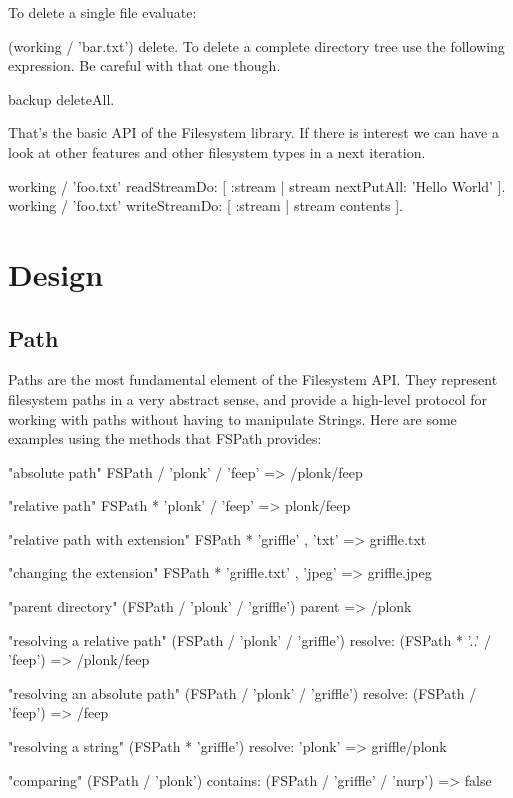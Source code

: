 \documentclass[a4paper,10pt,twoside]{book}
\begin{document}
To delete a single file evaluate:

 (working / 'bar.txt') delete.
To delete a complete directory tree use the following expression. Be careful with that one though.

 backup deleteAll.
 
That's the basic API of the Filesystem library. If there is interest we can have a look at other features and other filesystem types in a next iteration.



 working / 'foo.txt' readStreamDo: [ :stream | stream nextPutAll: 'Hello World' ].
 working / 'foo.txt' writeStreamDo: [ :stream | stream contents ].


\section{Design }

\subsection{Path}

Paths are the most fundamental element of the Filesystem API. They represent filesystem paths in a very abstract sense, and provide a high-level protocol for working with paths without having to manipulate Strings. Here are some examples using the methods that FSPath provides:

\begin{code}{}
    "absolute path"
    FSPath / 'plonk' / 'feep'       => /plonk/feep
    
    "relative path"
    FSPath * 'plonk' / 'feep'       => plonk/feep

    "relative path with extension"
    FSPath * 'griffle' , 'txt'      => griffle.txt
    
    "changing the extension"
    FSPath * 'griffle.txt' , 'jpeg'     => griffle.jpeg
    
    "parent directory"
    (FSPath / 'plonk' / 'griffle') parent   => /plonk
    
    "resolving a relative path"
    (FSPath / 'plonk' / 'griffle') resolve: (FSPath * '..' / 'feep')
                        => /plonk/feep
    
    "resolving an absolute path"
    (FSPath / 'plonk' / 'griffle') resolve: (FSPath / 'feep')
                        => /feep
                        
    "resolving a string"
    (FSPath * 'griffle') resolve: 'plonk'   => griffle/plonk
                        
    "comparing"
    (FSPath / 'plonk') contains: (FSPath / 'griffle' / 'nurp')
                        => false
\end{code}
\end{document}
